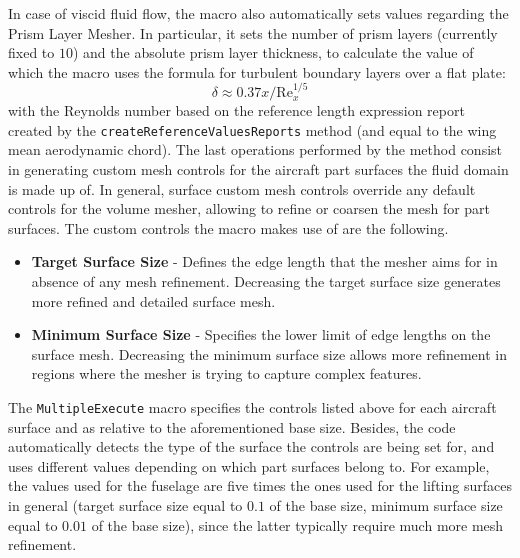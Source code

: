 %
In case of viscid fluid flow, the macro also automatically sets values regarding the Prism Layer Mesher. In particular, it sets the number of prism layers (currently fixed to $10$) and the absolute prism layer thickness, to calculate the value of which the macro uses the formula for turbulent boundary layers over a flat plate:
\[
\delta \approx 0.37x/{\text{Re}}_{x}^{1/5}
\]
with the Reynolds number based on the reference length expression report created by the \lstinline[language=Java]!createReferenceValuesReports! method (and equal to the wing mean aerodynamic chord). The last operations performed by the method consist in generating custom mesh controls for the aircraft part surfaces  the fluid domain is made up of. In general, surface custom mesh controls override any default controls for the volume mesher, allowing to refine or coarsen the mesh for part surfaces. The custom controls the macro makes use of are the following.
%
\begin{itemize}
\renewcommand\labelitemi{\tiny$\blacksquare$}
\renewcommand\labelitemii{\tiny$\bullet$}
\item \textbf{Target Surface Size} - Defines the edge length that the mesher aims for in absence of any mesh refinement. Decreasing the target surface size generates more refined and detailed surface mesh.
\item \textbf{Minimum Surface Size} - Specifies the lower limit of edge lengths on the surface mesh. Decreasing the minimum surface size allows more refinement in regions where the mesher is trying to capture complex features.
\end{itemize}
% 
The \lstinline[language=Java]!MultipleExecute! macro specifies the controls listed above for each aircraft surface and as relative to the aforementioned base size. Besides, the code automatically detects the type of the surface the controls are being set for, and uses different values depending on which part surfaces belong to. For example, the values used for the fuselage are five times the ones used for the lifting surfaces in general (target surface size equal to $0.1$ of the base size, minimum surface size equal to $0.01$ of the base size), since the latter typically require much more mesh refinement.
%
\bigskip
